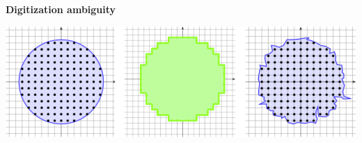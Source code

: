 \begin{frame}
\begin{center}
\begin{tabular}{ccc}
\end{tabular}
\end{center}

\pause
\textbf{Digitization ambiguity}

\begin{center}
\includegraphics[scale=1]{figures/digital-estimators/exact-sampling/ambiguity.png}
\end{center}

\end{frame}

